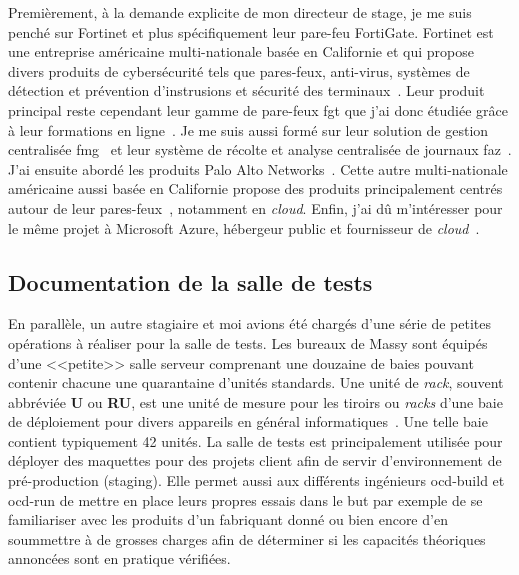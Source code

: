 \documentclass[12pt, oneside, a4paper, titlepage]{report}
\begin{document}
Premièrement, à la demande explicite de mon directeur de stage, je me suis
penché sur Fortinet et plus spécifiquement leur pare-feu FortiGate.  Fortinet
est une entreprise américaine multi-nationale basée en Californie et qui propose
divers produits de cybersécurité tels que pares-feux, anti-virus, systèmes de
détection et prévention d'instrusions et sécurité des terminaux~\cite{forti}.
Leur produit principal reste cependant leur gamme de pare-feux \gls{fgt} que
j'ai donc étudiée grâce à leur formations en ligne~\cite{fgt}. Je me suis aussi
formé sur leur solution de gestion centralisée \gls{fmg}~\cite{fmg} et leur
système de récolte et analyse centralisée de journaux \gls{faz}~\cite{faz}. J'ai
ensuite abordé les produits Palo Alto Networks~\cite{pan}. Cette autre
multi-nationale américaine aussi basée en Californie propose des produits
principalement centrés autour de leur pares-feux~\cite{pan-pa}, notamment en
\textit{cloud}. Enfin, j'ai dû m'intéresser pour le même projet à Microsoft
Azure, hébergeur public et fournisseur de \textit{cloud}~\cite{azure}.

\subsection{Documentation de la salle de tests}%
\label{sub:mission::prems::doc-salle-tests}

En parallèle, un autre stagiaire et moi avions été chargés d'une série de
petites opérations à réaliser pour la salle de tests. Les bureaux de Massy sont
équipés d'une <<petite>> salle serveur comprenant une douzaine de baies pouvant
contenir chacune une quarantaine d'unités standards. Une unité de \textit{rack},
souvent abbréviée \textbf{U} ou \textbf{RU}, est une unité de mesure pour les
tiroirs ou \textit{racks} d'une baie de déploiement pour divers appareils en
général informatiques~\cite{rack-unit}. Une telle baie contient typiquement 42
unités. La salle de tests est principalement utilisée pour déployer des
maquettes pour des projets client afin de servir d'environnement de
pré-production (\gls{staging}).  Elle permet aussi aux différents ingénieurs
\gls{ocd-build} et \gls{ocd-run} de mettre en place leurs propres essais dans le
but par exemple de se familiariser avec les produits d'un fabriquant donné ou
bien encore d'en soummettre à de grosses charges afin de déterminer si les
capacités théoriques annoncées sont en pratique vérifiées.
\end{document}
